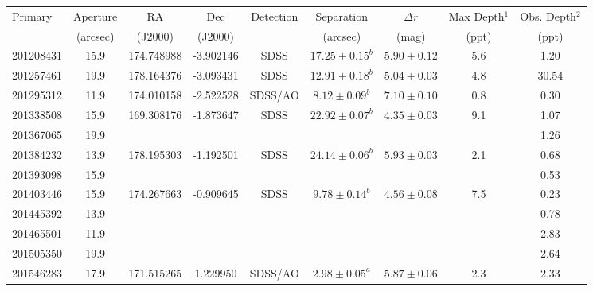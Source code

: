 \begin{landscape}
\begin{table}[hbt!]
\tiny
\begin{center}
\begin{tabular}{lcccccccc}
\hline
Primary & Aperture & RA & Dec & Detection & Separation & $\Delta r$ & Max Depth$^1$ &
Obs. Depth$^2$ \\
   & (arcsec) & (J2000) & (J2000) & & (arcsec) & (mag) & (ppt) & (ppt) \\
\hline
 201208431  & 15.9 & 174.748988  & -3.902146  &  SDSS  &       $17.25 \pm 0.15^b$  & $5.90 \pm 0.12$ & 5.6 & 1.20 \\
 201257461  & 19.9 & 178.164376  & -3.093431  &  SDSS  &       $ 12.91 \pm 0.18^b$ & $5.04 \pm 0.03$ & 4.8 & 30.54 \\
 201295312  & 11.9 &  174.010158  & -2.522528  &  SDSS/AO &  $8.12 \pm 0.09^b$   & $7.10 \pm 0.10$ & 0.8 & 0.30 \\
 201338508  & 15.9 & 169.308176  & -1.873647  & SDSS      &    $22.92 \pm 0.07^b$ & $4.35 \pm 0.03$ & 9.1 & 1.07 \\
 201367065  & 19.9 &                  &                       &                &                                                            &                          &          & 1.26  \\
 201384232  & 13.9 & 178.195303 &  -1.192501  & SDSS      &   $24.14 \pm 0.06^b$ & $5.93 \pm 0.03$ & 2.1 & 0.68 \\
 201393098  & 15.9 &                  &                       &                &                                                           &                          &          & 0.53  \\
 201403446  & 15.9 & 174.267663 &  -0.909645  & SDSS      &    $9.78 \pm 0.14^b$ & $4.56 \pm 0.08$ & 7.5 & 0.23 \\ 
 201445392  & 13.9 &                &                       &                &                                                           &                          &             & 0.78 \\
 201465501  & 11.9 &                 &                       &                &                                                           &                          &            & 2.83 \\
 201505350  & 19.9 &                  &                       &                &                                                           &                          &           & 2.64  \\
 201546283  & 17.9 & 171.515265  &  1.229950  &  SDSS/AO &  $2.98 \pm 0.05^a$   & $5.87 \pm 0.06$ & 2.3 & 2.33 \\

\end{tabular}
\end{center}
\end{table}
\end{landscape}
